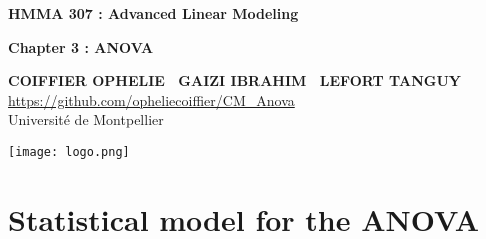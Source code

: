 \documentclass[unknownkeysallowed]{beamer}
\begin{document}



\begin{frame}[noframenumbering]
\thispagestyle{empty}
\bigskip
\bigskip
\begin{center}{
\LARGE\color{marron}
\textbf{HMMA 307 : Advanced Linear Modeling}
\textbf{ }\\
\vspace{0.5cm}
}

\color{marron}
\textbf{Chapter 3 : ANOVA}
\end{center}

\vspace{0.5cm}

\begin{center}
\textbf{COIFFIER OPHELIE \ GAIZI IBRAHIM \ LEFORT TANGUY } \\
\vspace{0.1cm}
\url{https://github.com/opheliecoiffier/CM_Anova}\\
\vspace{0.5cm}
Université de Montpellier \\
\end{center}

\centering
\texttt{[image: logo.png]}
\end{frame}



\begin{frame}[noframenumbering]
\thispagestyle{empty}
\tableofcontents
\end{frame}




\section{Statistical model for the ANOVA}

\end{document}
